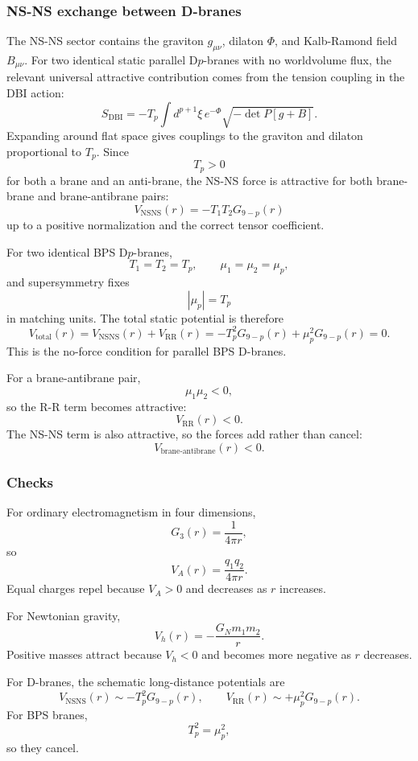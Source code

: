 \documentclass[
  10pt,
  a4paper,
  openany]{book}
\begin{document}
\subsubsection{NS-NS exchange between
D-branes}\label{ns-ns-exchange-between-d-branes}

The NS-NS sector contains the graviton \(g_{\mu\nu}\), dilaton \(\Phi\),
and Kalb-Ramond field \(B_{\mu\nu}\). For two identical static parallel
D\(p\)-branes with no worldvolume flux, the relevant universal
attractive contribution comes from the tension coupling in the DBI
action: \[
S_{\mathrm{DBI}}
=
-T_p
\int d^{p+1}\xi\,
e^{-\Phi}
\sqrt{-\det P[g+B]}.
\] Expanding around flat space gives couplings to the graviton and
dilaton proportional to \(T_p\). Since \[
T_p>0
\] for both a brane and an anti-brane, the NS-NS force is attractive for
both brane-brane and brane-antibrane pairs: \[
V_{\mathrm{NSNS}}(r)
=
-T_1T_2G_{9-p}(r)
\] up to a positive normalization and the correct tensor coefficient.

For two identical BPS D\(p\)-branes, \[
T_1=T_2=T_p,
\qquad
\mu_1=\mu_2=\mu_p,
\] and supersymmetry fixes \[
|\mu_p|=T_p
\] in matching units. The total static potential is therefore \[
V_{\mathrm{total}}(r)
=
V_{\mathrm{NSNS}}(r)+V_{\mathrm{RR}}(r)
=
-T_p^2G_{9-p}(r)
+
\mu_p^2G_{9-p}(r)
=
0.
\] This is the no-force condition for parallel BPS D-branes.

For a brane-antibrane pair, \[
\mu_1\mu_2<0,
\] so the R-R term becomes attractive: \[
V_{\mathrm{RR}}(r)<0.
\] The NS-NS term is also attractive, so the forces add rather than
cancel: \[
V_{\mathrm{brane\text{-}antibrane}}(r)<0.
\]

\subsubsection{Checks}\label{checks-4}

For ordinary electromagnetism in four dimensions, \[
G_3(r)=\frac{1}{4\pi r},
\] so \[
V_A(r)=\frac{q_1q_2}{4\pi r}.
\] Equal charges repel because \(V_A>0\) and decreases as \(r\)
increases.

For Newtonian gravity, \[
V_h(r)=-\frac{G_Nm_1m_2}{r}.
\] Positive masses attract because \(V_h<0\) and becomes more negative
as \(r\) decreases.

For D-branes, the schematic long-distance potentials are \[
V_{\mathrm{NSNS}}(r)\sim -T_p^2G_{9-p}(r),
\qquad
V_{\mathrm{RR}}(r)\sim +\mu_p^2G_{9-p}(r).
\] For BPS branes, \[
T_p^2=\mu_p^2,
\] so they cancel.
\end{document}

